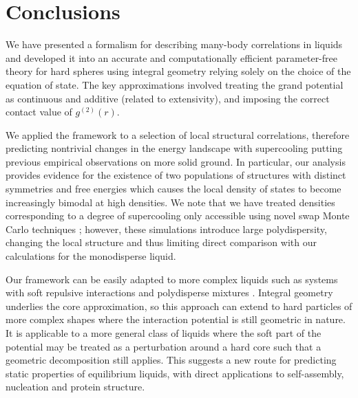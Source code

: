 \documentclass[11pt,twoside]{report}
\begin{document}
\section{Conclusions}

We have presented a formalism for describing many-body correlations in liquids and developed it into an accurate and computationally efficient parameter-free theory for hard spheres using integral geometry relying solely on the choice of the equation of state.
The key approximations involved treating the grand potential as continuous and additive (related to extensivity), and imposing the correct contact value of $g^{(2)}(r)$.

We applied the framework to a selection of local structural correlations, therefore predicting nontrivial changes in the energy landscape with supercooling putting previous empirical observations on more solid ground.
In particular, our analysis provides evidence for the existence of two populations of structures with distinct symmetries and free energies which causes the local density of states to become increasingly bimodal at high densities.
We note that we have treated densities corresponding to a degree of supercooling only accessible using novel swap Monte Carlo techniques \cite{BerthierPRL2016}; however, these simulations introduce large polydispersity, changing the local structure \cite{CoslovichJPCM2018} and thus limiting direct comparison with our calculations for the monodisperse liquid.

Our framework can be easily adapted to more complex liquids such as systems with soft repulsive interactions and polydisperse mixtures \cite{KodamaJCP2011}.
Integral geometry underlies the core approximation, so this approach can extend to hard particles of more complex shapes where the interaction potential is still geometric in nature.
It is applicable to a more general class of liquids where the soft part of the potential may be treated as a perturbation around a hard core \cite{Hansen2013} such that a geometric decomposition still applies.
This suggests a new route for predicting static properties of equilibrium liquids, with direct applications to self-assembly, nucleation and protein structure.


\end{document}
